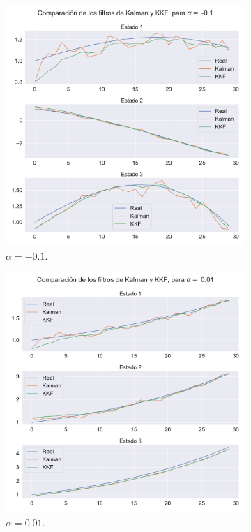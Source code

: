 \begin{figure}[h!]
    \centering
    \begin{subfigure}[b]{0.49\textwidth}
        \centering
        \includegraphics[width=0.75\linewidth]{img/content/chapter4/kalman_kkkf_01.pdf}
    \caption{$\alpha = -0.1$.}
    \label{fig:kalman_vs_KKF_01}
    \end{subfigure}
    \begin{subfigure}[b]{0.49\textwidth}
        \centering \includegraphics[width=0.75\linewidth]{img/content/chapter4/kalman_kkkf_001.pdf}
    \caption{$\alpha = 0.01$.}
    \label{fig:kalman_vs_KKF_001}
    \end{subfigure}
    \begin{subfigure}[b]{0.49\textwidth}

\end{subfigure}
\end{figure}
